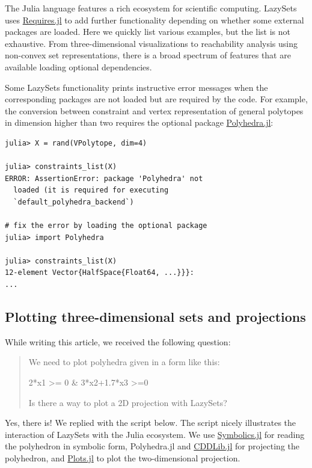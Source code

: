 The Julia language features a rich ecosystem for scientific computing.
%
LazySets uses \href{https://github.com/JuliaPackaging/Requires.jl}{Requires.jl} to add further functionality depending on whether some external packages are loaded.
%
Here we quickly list various examples, but the list is not exhaustive.
%
From three-dimensional visualizations to reachability analysis using non-convex set representations, there is a broad spectrum of features that are available loading optional dependencies.

\smallskip

Some LazySets functionality prints instructive error messages when the corresponding packages are not loaded but are required by the code. For example, the conversion between constraint and vertex representation of general polytopes in dimension higher than two requires the optional package \href{https://github.com/JuliaPolyhedra/Polyhedra.jl}{Polyhedra.jl}:

\begin{minipage}{\linewidth}
\begin{lstlisting}
julia> X = rand(VPolytope, dim=4)
	
julia> constraints_list(X)
ERROR: AssertionError: package 'Polyhedra' not
  loaded (it is required for executing
  `default_polyhedra_backend`)

# fix the error by loading the optional package
julia> import Polyhedra

julia> constraints_list(X)
12-element Vector{HalfSpace{Float64, ...}}}:
...
	\end{lstlisting}
\end{minipage}


\subsection{Plotting three-dimensional sets and projections}

While writing this article, we received the following question:

\begin{quote}
We need to plot polyhedra given in a form like this:

\begin{center}
	2*x1 >= 0 \& 3*x2+1.7*x3 >=0
\end{center}

Is there a way to plot a 2D projection with LazySets?
\end{quote}

Yes, there is!
We replied with the script below.
The script nicely illustrates the interaction of LazySets with the Julia ecosystem.
We use \href{https://github.com/JuliaSymbolics/Symbolics.jl}{Symbolics.jl} for reading the polyhedron in symbolic form, Polyhedra.jl and \href{https://github.com/JuliaPolyhedra/CDDLib.jl}{CDDLib.jl} for projecting the polyhedron, and \href{https://github.com/JuliaPlots/Plots.jl}{Plots.jl} to plot the two-dimensional projection.


